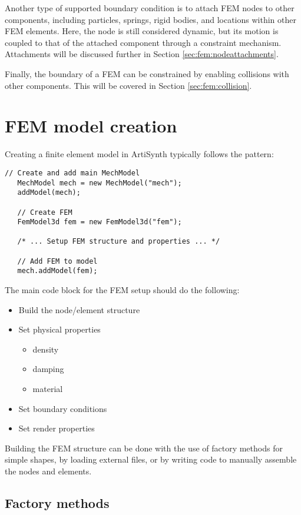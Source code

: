 Another type of supported boundary condition is to attach FEM nodes to other
components, including particles, springs, rigid bodies, and locations within
other FEM elements.  Here, the node is still considered dynamic, but its
motion is coupled to that of the attached component through a constraint
mechanism. Attachments will be discussed further in Section 
\ref{sec:fem:nodeattachments}.

Finally, the boundary of a FEM can be constrained by enabling collisions
with other components.  This will be covered in Section
\ref{sec:fem:collision}.


\section{FEM model creation}

Creating a finite element model in ArtiSynth typically follows the pattern:
\begin{lstlisting}[]
   // Create and add main MechModel
   MechModel mech = new MechModel("mech");
   addModel(mech);
      
   // Create FEM
   FemModel3d fem = new FemModel3d("fem");
   
   /* ... Setup FEM structure and properties ... */
   
   // Add FEM to model
   mech.addModel(fem); 
\end{lstlisting}
The main code block for the FEM setup should do the following:
\begin{itemize}
	\setlength{\itemsep}{-0.3em}
	\item Build the node/element structure
	\item Set physical properties%
	\ifLaTeXMLelse{}{\vspace{-0.5em}}
	\begin{itemize}
		\setlength{\itemsep}{-0.3em}
		\item density
		\item damping
		\item material
	\end{itemize} 
	\item Set boundary conditions
	\item Set render properties
\end{itemize}
Building the FEM structure can be done with the use of factory
methods for simple shapes, by loading external files, or by writing code
to manually assemble the nodes and elements.

\subsection{Factory methods}

